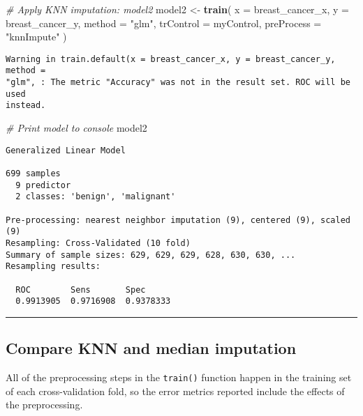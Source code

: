 \documentclass[
]{book}
\newenvironment{Shaded}{\begin{snugshade}}{\end{snugshade}}
\newcommand{\CommentTok}[1]{\textcolor[rgb]{0.56,0.35,0.01}{\textit{#1}}}
\newcommand{\DataTypeTok}[1]{\textcolor[rgb]{0.13,0.29,0.53}{#1}}
\newcommand{\KeywordTok}[1]{\textcolor[rgb]{0.13,0.29,0.53}{\textbf{#1}}}
\newcommand{\NormalTok}[1]{#1}
\newcommand{\StringTok}[1]{\textcolor[rgb]{0.31,0.60,0.02}{#1}}
\begin{document}
\begin{Shaded}
\begin{Highlighting}[]
\CommentTok{# Apply KNN imputation: model2}
\NormalTok{model2 <-}\StringTok{ }\KeywordTok{train}\NormalTok{(}
  \DataTypeTok{x =}\NormalTok{ breast_cancer_x, }\DataTypeTok{y =}\NormalTok{ breast_cancer_y,}
  \DataTypeTok{method =} \StringTok{"glm"}\NormalTok{,}
  \DataTypeTok{trControl =}\NormalTok{ myControl,}
  \DataTypeTok{preProcess =} \StringTok{"knnImpute"}
\NormalTok{)}
\end{Highlighting}
\end{Shaded}

\begin{verbatim}
Warning in train.default(x = breast_cancer_x, y = breast_cancer_y, method =
"glm", : The metric "Accuracy" was not in the result set. ROC will be used
instead.
\end{verbatim}

\begin{Shaded}
\begin{Highlighting}[]
\CommentTok{# Print model to console}
\NormalTok{model2}
\end{Highlighting}
\end{Shaded}

\begin{verbatim}
Generalized Linear Model 

699 samples
  9 predictor
  2 classes: 'benign', 'malignant' 

Pre-processing: nearest neighbor imputation (9), centered (9), scaled (9) 
Resampling: Cross-Validated (10 fold) 
Summary of sample sizes: 629, 629, 629, 628, 630, 630, ... 
Resampling results:

  ROC        Sens       Spec     
  0.9913905  0.9716908  0.9378333
\end{verbatim}

\begin{center}\rule{0.5\linewidth}{0.5pt}\end{center}

\hypertarget{compare-knn-and-median-imputation}{%
\subsection*{Compare KNN and median imputation}\label{compare-knn-and-median-imputation}}

All of the preprocessing steps in the \texttt{train()} function happen in the training set of each cross-validation fold, so the error metrics reported include the effects of the preprocessing.
\end{document}
